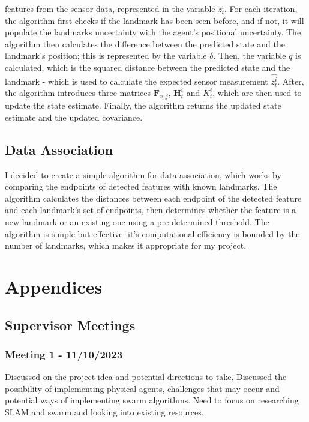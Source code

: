 \documentclass[12pt]{article}
\begin{document}
features from the sensor data, represented in the variable \(z^i_t\). For each iteration, the algorithm first checks if the landmark has been
seen before, and if not, it will populate the landmarks uncertainty with the agent's positional uncertainty. The algorithm then calculates
the difference between the predicted state and the landmark's position; this is represented by the variable \(\delta\). Then, the variable
\(q\) is calculated, which is the squared distance between the predicted state and the landmark - which is used to calculate the expected
sensor measurement \(\hat{z^i_t}\). After, the algorithm introduces three matrices \(\mathbf{F}_{x,j}\), \(\mathbf{H}_t^i\) and \(K_t^i\), which
are then used to update the state estimate. Finally, the algorithm returns the updated state estimate and the updated covariance.\\



\subsection{Data Association}
I decided to create a simple algorithm for data association, which works by comparing the endpoints of detected features with known
landmarks. The algorithm calculates the distances between each endpoint of the detected feature and each landmark's set of endpoints,
then determines whether the feature is a new landmark or an existing one using a pre-determined threshold. The algorithm is simple
but effective; it's computational efficiency is bounded by the number of landmarks, which makes it appropriate for my project.\\




\section{Appendices}

\subsection{Supervisor Meetings}    %

\subsubsection{Meeting 1 - 11/10/2023}
Discussed on the project idea and potential directions to take. Discussed the possibility of implementing physical agents,
challenges that may occur and potential ways of implementing swarm algorithms. Need to focus on researching SLAM and swarm
and looking into existing resources.
\end{document}
